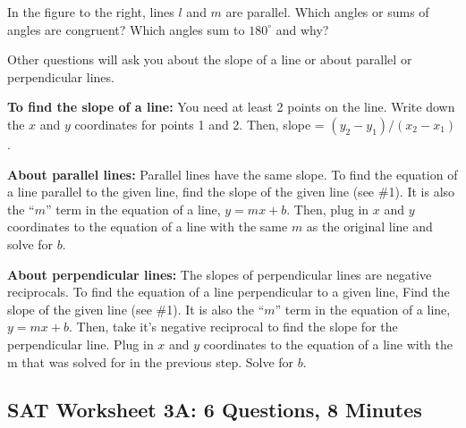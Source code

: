 In the figure to the right, lines $l$ and $m$ are parallel. Which angles or sums of angles are congruent? Which angles sum to $180^\circ$ and why?

\begin{center}
\end{center}

Other questions will ask you about the slope of a line or about parallel or perpendicular lines.

\bigskip
\textbf{To find the slope of a line:} You need at least 2 points on the line. Write down the $x$ and $y$ coordinates for points 1 and 2. Then, slope = $(y_2-y_1)/(x_2-x_1)$.

\bigskip
\textbf{About parallel lines:} Parallel lines have the same slope. To find the equation of a line parallel to the given line, find the slope of the given line (see \#1). It is also the ``$m$'' term in the equation of a line, $y=mx+b$. Then, plug in $x$ and $y$ coordinates to the equation of a line with the same $m$ as the original line and solve for $b$.

\bigskip
\textbf{About perpendicular lines:} The slopes of perpendicular lines are negative reciprocals. To find the equation of a line perpendicular to a given line, Find the slope of the given line (see \#1). It is also the ``$m$'' term in the equation of a line, $y=mx+b$. Then, take it's negative reciprocal to find the slope for the perpendicular line. Plug in $x$ and $y$ coordinates to the equation of a line with the m that was solved for in the previous step. Solve for $b$.

\newpage
\subsection{SAT Worksheet 3A: 6 Questions, 8 Minutes}

